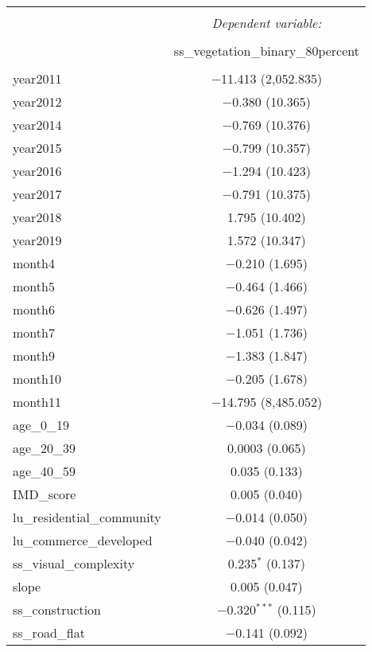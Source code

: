 \begin{table}[!htbp] \centering 
  \caption{} 
  \label{} 
\small 
\begin{tabular}{@{\extracolsep{1pt}}lc} 
\\[-1.8ex]\hline 
\hline \\[-1.8ex] 
 & \multicolumn{1}{c}{\textit{Dependent variable:}} \\ 
\cline{2-2} 
\\[-1.8ex] & ss\_vegetation\_binary\_80percent \\ 
\hline \\[-1.8ex] 
 year2011 & $-$11.413 (2,052.835) \\ 
  year2012 & $-$0.380 (10.365) \\ 
  year2014 & $-$0.769 (10.376) \\ 
  year2015 & $-$0.799 (10.357) \\ 
  year2016 & $-$1.294 (10.423) \\ 
  year2017 & $-$0.791 (10.375) \\ 
  year2018 & 1.795 (10.402) \\ 
  year2019 & 1.572 (10.347) \\ 
  month4 & $-$0.210 (1.695) \\ 
  month5 & $-$0.464 (1.466) \\ 
  month6 & $-$0.626 (1.497) \\ 
  month7 & $-$1.051 (1.736) \\ 
  month9 & $-$1.383 (1.847) \\ 
  month10 & $-$0.205 (1.678) \\ 
  month11 & $-$14.795 (8,485.052) \\ 
  age\_0\_19 & $-$0.034 (0.089) \\ 
  age\_20\_39 & 0.0003 (0.065) \\ 
  age\_40\_59 & 0.035 (0.133) \\ 
  IMD\_score & 0.005 (0.040) \\ 
  lu\_residential\_community & $-$0.014 (0.050) \\ 
  lu\_commerce\_developed & $-$0.040 (0.042) \\ 
  ss\_visual\_complexity & 0.235$^{*}$ (0.137) \\ 
  slope & 0.005 (0.047) \\ 
  ss\_construction & $-$0.320$^{***}$ (0.115) \\ 
  ss\_road\_flat & $-$0.141 (0.092) \\ 

\end{tabular}
\end{table}
